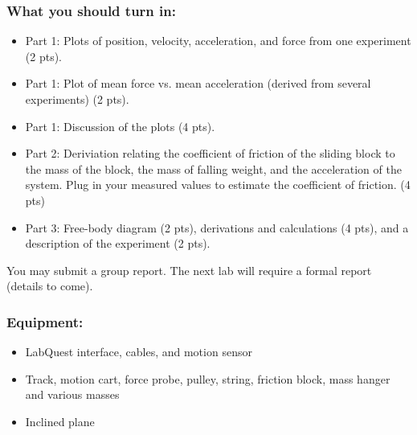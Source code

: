\documentclass[11pt,letterpaper]{article}
\begin{document}
\subsubsection*{What you should turn in:}
\begin{itemize}
\setlength{\parskip}{3pt}
\item Part 1: Plots of position, velocity, acceleration, and force from one experiment (2 pts).
\item Part 1: Plot of mean force vs. mean acceleration (derived from several experiments) (2 pts).
\item Part 1: Discussion of the plots (4 pts).
\item Part 2: Deriviation relating the coefficient of friction of the sliding block to the mass of the block, the mass of falling weight, and the acceleration of the system. Plug in your measured values to estimate the coefficient of friction. (4 pts)
\item Part 3: Free-body diagram (2 pts), derivations and calculations (4 pts), and a description of the experiment (2 pts).
\end{itemize}
You may submit a group report. The next lab will require a formal report (details to come). 

\subsubsection*{Equipment:}
\begin{itemize}
\setlength{\parskip}{3pt}
\item LabQuest interface, cables, and motion sensor
\item Track, motion cart, force probe, pulley, string, friction block, mass hanger and various masses
\item Inclined plane
\end{itemize}
\end{document}

